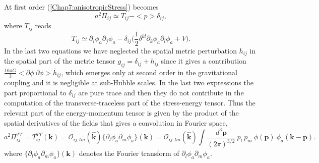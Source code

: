 \documentclass[11pt,a4paper,twoside]{book}
\begin{document}
At first order (\ref{Chap7:anisotropicStress}) becomes
\begin{equation}
\label{Chap7:anisotropicStressDelta}
a^{2}\Pi_{ij}\simeq T_{ij}-<p>\delta_{ij},
\end{equation}
where $ T_{ij} $ reads
\begin{equation}
\label{Chap7:stressEnergyTensorDelta}
T_{ij}\simeq\partial_{i}\phi_{a}\partial_{j}\phi_{a} - \delta_{ij}\Bigg(\frac{1}{2}\delta^{kl}\partial_{k}\phi_{a}\partial_l \phi_{a} + V \Bigg).
\end{equation}
In the last two equations we have neglected the spatial metric perturbation $ h_{ij} $ in the spatial part of the metric tensor $ g_{ij}=\delta_{ij}+ h_{ij} $ since it gives a contribution $ \frac{16\pi G}{3}<\partial \phi\ \partial \phi > \bar{h}_{ij} $, which emerges only at second order in the gravitational coupling and it is negligible at sub-Hubble scales. In the last two expressions the part proportional to $\delta_{ij}$ are pure trace and then they do not contribute in the computation of the transverse-traceless part of the stress-energy tensor. Thus the relevant part of the energy-momentum tensor is given by the product of the spatial derivatives of the fields that gives a convolution in Fourier space,
\begin{equation}
\label{Chap7:stressEnergyTensor}
a^{2}\Pi^{TT}_{ij}=T^{TT}_{ij}(\textbf{k})=\mathcal{O}_{ij,lm}(\hat{\textbf{k}}) \{\partial_{l}\phi_{a}\partial_{m}\phi_{a}\} (\textbf{k}) = \mathcal{O}_{ij,lm}(\hat{\textbf{k}}) \int \frac{d^{3}\textbf{p}}{(2\pi)^{3/2}}\ p_{l}\  p_{m}\ \phi(\textbf{p})\ \phi_{a}(\textbf{k} - \textbf{p}).
\end{equation}
where $ \{\partial_{l}\phi_{a}\partial_{m}\phi_{a}\}(\textbf{k}) $ denotes the Fourier transform of $ \partial_{l}\phi_{a}\partial_{m}\phi_{a} $.
\end{document}
